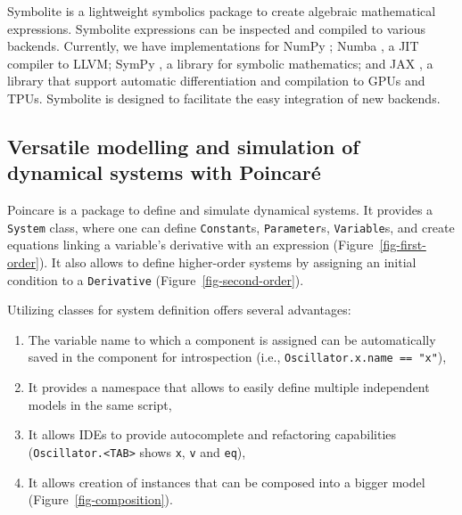 \documentclass{article}
\providecommand{\tightlist}{%
  \setlength{\itemsep}{0pt}\setlength{\parskip}{0pt}}\usepackage{longtable,booktabs}
\begin{document}
Symbolite is a lightweight symbolics package to create algebraic
mathematical expressions. Symbolite expressions can be inspected and
compiled to various backends. Currently, we have implementations for
NumPy \cite{harrisArrayProgrammingNumPy2020}; Numba \cite{lamNumbaLLVMbasedPython2015},
a \ac{JIT} compiler to LLVM; SymPy \cite{meurerSymPySymbolicComputing2017}, a
library for symbolic mathematics; and JAX \cite{jax2018github}, a
library that support automatic differentiation and compilation to \acp{GPU}
and \acp{TPU}. Symbolite is designed to facilitate the easy integration of
new backends.

\hypertarget{versatile-modelling-and-simulation-of-dynamical-systems-with-poincaruxe9}{%
\subsection{Versatile modelling and simulation of dynamical systems with
Poincaré}\label{versatile-modelling-and-simulation-of-dynamical-systems-with-poincaruxe9}}



Poincare is a package to define and simulate dynamical systems. It
provides a \texttt{System} class, where one can define
\texttt{Constant}s, \texttt{Parameter}s, \texttt{Variable}s, and create
equations linking a variable's derivative with an expression
(Figure~\ref{fig-first-order}). It also allows to define higher-order
systems by assigning an initial condition to a \texttt{Derivative}
(Figure~\ref{fig-second-order}).

Utilizing classes for system definition offers several advantages:

\begin{enumerate}
\def\labelenumi{\arabic{enumi}.}
\tightlist
\item
  The variable name to which a component is assigned can be
  automatically saved in the component for introspection (i.e.,
  \texttt{Oscillator.x.name\ ==\ "x"}),
\item
  It provides a namespace that allows to easily define multiple
  independent models in the same script,
\item
  It allows \acp{IDE} to provide autocomplete and refactoring capabilities
  (\texttt{Oscillator.\textless{}TAB\textgreater{}} shows \texttt{x},
  \texttt{v} and \texttt{eq}),
\item
  It allows creation of instances that can be composed into a bigger
  model (Figure~\ref{fig-composition}).
\end{enumerate}
\end{document}
